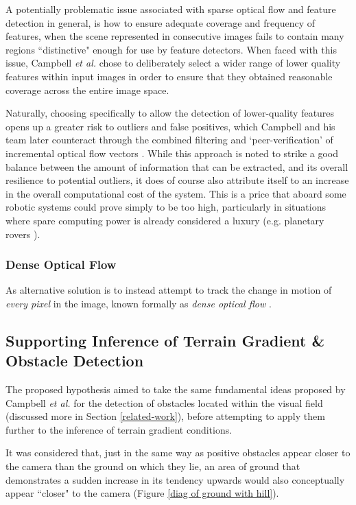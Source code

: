 A potentially problematic issue associated with sparse optical flow and feature detection in general, is how to ensure adequate coverage and frequency of features, when the scene represented in consecutive images fails to contain many regions ``distinctive" enough for use by feature detectors. When faced with this issue, Campbell \textit{et al.} \cite{campbell} chose to deliberately select a wider range of lower quality features within input images in order to ensure that they obtained reasonable coverage across the entire image space. 

Naturally, choosing specifically to allow the detection of lower-quality features opens up a greater risk to outliers and false positives, which Campbell and his team later counteract through the combined filtering and `peer-verification' of incremental optical flow vectors \cite{campbell}. While this approach is noted to strike a good balance between the amount of information that can be extracted, and its overall resilience to potential outliers, it does of course also attribute itself to an increase in the overall computational cost of the system. This is a price that aboard some robotic systems could prove simply to be too high, particularly in situations where spare computing power is already considered a luxury (e.g. planetary rovers \cite{mer}). 

\subsubsection{Dense Optical Flow}

As alternative solution is to instead attempt to track the change in motion of \textit{every pixel} in the image, known formally as \textit{dense optical flow} \cite{nourani}. 

\subsection{Supporting Inference of Terrain Gradient \& Obstacle Detection}
\label{hypo-gradient}

The proposed hypothesis aimed to take the same fundamental ideas proposed by Campbell \textit{et al.} \cite{campbell} for the detection of obstacles located within the visual field (discussed more in Section \ref{related-work}), before attempting to apply them further to the inference of terrain gradient conditions. 

It was considered that, just in the same way as positive obstacles appear closer to the camera than the ground on which they lie, an area of ground that demonstrates a sudden increase in its tendency upwards would also conceptually appear ``closer" to the camera (Figure \ref{diag of ground with hill}). 

